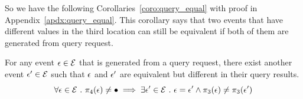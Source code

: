 {{So we have the following Corollaries~\ref{coro:query_equal} with proof in Appendix~\ref{apdx:query_equal}.
This corollary says that two events that have different values 
in the third location can still be equivalent if both of them are generated from query request.
\begin{coro}
 \label{coro:query_equal}
 For any event $\mathtt{\epsilon} \in \mathcal{E}$ that is generated from a query request, 
 there exist another event $\mathtt{\epsilon}' \in \mathcal{E}$ 
 such that 
 $\mathtt{\epsilon}$ and $\mathtt{\epsilon}'$ are equivalent but different in their query results.
 \[
 \forall \mathtt{\epsilon} \in \mathcal{E} ~.~ 
 \pi_4(\mathtt{\epsilon}) \neq \bullet
 \implies \exists 
 \mathtt{\epsilon}' \in \mathcal{E} ~.~ 
 \mathtt{\epsilon} = \mathtt{\epsilon}' \land \pi_3(\mathtt{\epsilon}) \neq \pi_3(\mathtt{\epsilon}')
 \]
 \end{coro}

 


}}
